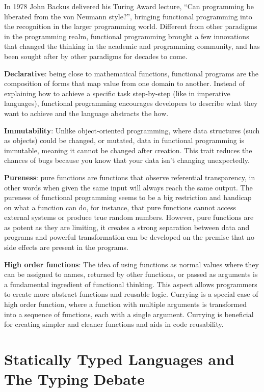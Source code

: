In 1978 John Backus delivered his Turing Award lecture, “Can programming be liberated from the von Neumann style?”, bringing functional programming into the recognition in the larger programming world. Different from other paradigms in the programming realm, functional programming brought a few innovations that changed the thinking in the academic and programming community, and has been sought after by other paradigms for decades to come.


\textbf{Declarative}: being close to mathematical functions, functional programs are the composition of forms that map value from one domain to another. Instead of explaining how to achieve a specific task step-by-step (like in imperative languages), functional programming encourages developers to describe what they want to achieve and the language abstracts the how.


\textbf{Immutability}: Unlike object-oriented programming, where data structures (such as objects) could be changed, or mutated, data in functional programming is immutable, meaning it cannot be changed after creation. This trait reduces the chances of bugs because you know that your data isn't changing unexpectedly.


\textbf{Pureness}: pure functions are functions that observe referential transparency, in other words when given the same input will always reach the same output. The pureness of functional programming seems to be a big restriction and handicap on what a function can do, for instance, that pure functions cannot access external systems or produce true random numbers. However, pure functions are as potent as they are limiting, it creates a strong separation between data and programs and powerful transformation can be developed on the premise that no side effects are present in the programs.


\textbf{High order functions}: The idea of using functions as normal values where they can be assigned to names, returned by other functions, or passed as arguments is a fundamental ingredient of functional thinking. This aspect allows programmers to create more abstract functions and reusable logic. Currying is a special case of high order function, where a function with multiple arguments is transformed into a sequence of functions, each with a single argument. Currying is beneficial for creating simpler and cleaner functions and aids in code reusability.

\section{Statically Typed Languages and The Typing Debate}


